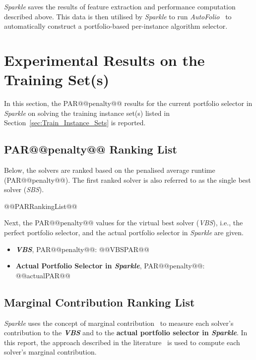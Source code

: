 \documentclass[british]{article}
\begin{document}
\emph{Sparkle} saves the results of feature extraction and performance computation described above. This data is then utilised by \emph{Sparkle} to run \emph{AutoFolio}~\cite{LinEtAl15} to automatically construct a portfolio-based per-instance algorithm selector.

\section{Experimental Results on the Training Set(s)}
\label{sec:Experimental_Results_Train}

In this section, the PAR@@penalty@@ results for the current portfolio selector in \emph{Sparkle} on solving the training instance set(s) listed in Section~\ref{sec:Train_Instance_Sets} is reported.

\subsection{PAR@@penalty@@ Ranking List}
\label{sec:PAR_Ranking}

Below, the solvers are ranked based on the penalised average runtime (PAR@@penalty@@). The first ranked solver is also referred to as the single best solver (\emph{SBS}).

\begin{enumerate}
@@PARRankingList@@
\end{enumerate}

Next, the PAR@@penalty@@ values for the virtual best solver (\emph{VBS}), i.e., the perfect portfolio selector, and the actual portfolio selector in \emph{Sparkle} are given.

\begin{itemize}
\item \textbf{\emph{VBS}}, PAR@@penalty@@: @@VBSPAR@@
\item \textbf{Actual Portfolio Selector in \emph{Sparkle}}, PAR@@penalty@@: @@actualPAR@@
\end{itemize}

\subsection{Marginal Contribution Ranking List}
\label{sec:Marginal_Contribution_Ranking}

\emph{Sparkle} uses the concept of marginal contribution~\cite{XuEtAl12} to measure each solver's contribution to the \textbf{\emph{VBS}} and to the \textbf{actual portfolio selector in \emph{Sparkle}}. In this report, the approach described in the literature~\cite{FreEtAl16} is used to compute each solver's marginal contribution.
\end{document}
